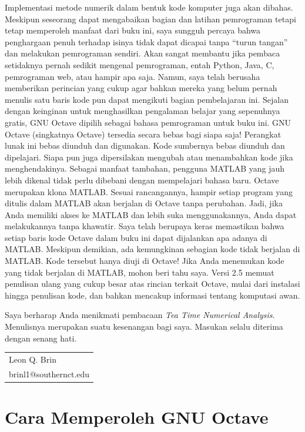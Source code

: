 Implementasi metode numerik dalam bentuk kode komputer juga akan dibahas.
Meskipun seseorang dapat mengabaikan bagian dan latihan pemrograman
tetapi tetap memperoleh manfaat dari buku ini, saya sungguh percaya
bahwa penghargaan penuh terhadap isinya tidak dapat dicapai tanpa
``turun tangan'' dan melakukan pemrograman sendiri. Akan sangat
membantu jika pembaca setidaknya pernah sedikit mengenal pemrograman,
entah Python, Java, C, pemrograman web, atau hampir apa saja. Namun,
saya telah berusaha memberikan perincian yang cukup agar bahkan mereka
yang belum pernah menulis satu baris kode pun dapat mengikuti bagian
pembelajaran ini. Sejalan dengan keinginan untuk menghasilkan pengalaman
belajar yang sepenuhnya gratis, GNU Octave dipilih sebagai bahasa
pemrograman untuk buku ini. GNU Octave (singkatnya Octave) tersedia
secara bebas bagi siapa saja! Perangkat lunak ini bebas diunduh dan
digunakan. Kode sumbernya bebas diunduh dan dipelajari. Siapa pun
juga dipersilakan mengubah atau menambahkan kode jika menghendakinya.
Sebagai manfaat tambahan, pengguna MATLAB yang jauh lebih dikenal
tidak perlu dibebani dengan mempelajari bahasa baru. Octave merupakan
klona MATLAB. Sesuai rancangannya, hampir setiap program yang ditulis
dalam MATLAB akan berjalan di Octave tanpa perubahan. Jadi, jika Anda
memiliki akses ke MATLAB dan lebih suka menggunakannya, Anda dapat
melakukannya tanpa khawatir. Saya telah berupaya keras memastikan
bahwa setiap baris kode Octave dalam buku ini dapat dijalankan apa
adanya di MATLAB. Meskipun demikian, ada kemungkinan sebagian kode
tidak berjalan di MATLAB. Kode tersebut hanya diuji di Octave! Jika
Anda menemukan kode yang tidak berjalan di MATLAB, mohon beri tahu
saya. Versi 2.5 memuat penulisan ulang yang cukup besar atas rincian
terkait Octave, mulai dari instalasi hingga penulisan kode, dan bahkan
mencakup informasi tentang komputasi awan.

Saya berharap Anda menikmati pembacaan \textit{Tea Time Numerical
Analysis}. Menulisnya merupakan suatu kesenangan bagi saya. Masukan
selalu diterima dengan senang hati.

\bigskip{}

\hfill{} \hfill{} %
\begin{tabular}{l}
Leon Q. Brin\tabularnewline
brinl1@southernct.edu\tabularnewline
\end{tabular} \hfill{} 

\section*{Cara Memperoleh GNU Octave}

